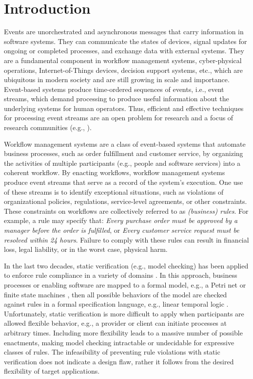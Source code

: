\chapter{Introduction}
\label{chapter:introduction}

Events are unorchestrated and asynchronous messages
that carry information in software systems.
They can communicate the states of devices,
signal updates for ongoing or completed processes,
and exchange data with external systems.
They are a fundamental component in
workflow management systems,
cyber-physical operations,
Internet-of-Things devices,
decision support systems,
etc.,
which are ubiquitous in modern society
and are still growing in scale and importance.
Event-based systems produce time-ordered sequences of events,
i.e., event streams,
which demand processing to produce useful information
about the underlying systems for human operators.
Thus,
efficient and effective techniques for processing event streams
are an open problem for research
and a focus of research communities
(e.g., \cite{zhou2022proceedings}).

Workflow management systems
are a class of event-based systems
that automate business processes,
such as order fulfillment and customer service,
by organizing the activities of multiple participants
(e.g., people and software services)
into a coherent workflow.
By enacting workflows,
workflow management systems produce event streams
that serve as a record of the system's execution.
One use of these streams is
to identify exceptional situations,
such as
violations of organizational policies,
regulations, service-level agreements,
or other constraints.
These constraints on workflows
are collectively referred to as {\em (business) rules}.
For example,
a rule may specify that:
{\em Every purchase order must be approved by a manager
before the order is fulfilled},
or
{\em Every customer service request must be resolved within 24 hours}.
Failure to comply with these rules
can result in financial loss,
legal liability,
or in the worst case,
physical harm.

In the last two decades,
static verification (e.g., model checking) has been applied to enforce rule compliance
in a variety of domains \cite{DamaggioDHV:BPM11:verif,CalvanesePODS13}.
In this approach, 
business processes or 
enabling software
are mapped to a formal model,
e.g., a Petri net \cite{du2014timed}
or finite state machines
\cite{BultanSF:IEEEIC,krotsiani2017cloud},
then
all possible behaviors of the model
are checked against rules in a formal specification language,
e.g., linear temporal logic \cite{pnueli1977temporal}.
Unfortunately,
static verification is more difficult to apply
when participants
are allowed flexible behavior,
e.g., a provider or client can initiate processes at arbitrary times.
Including more flexibility
leads to a massive number of possible enactments,
making model checking intractable or undecidable
for expressive classes of rules.
The infeasibility of
preventing rule violations with static verification 
does not indicate a design flaw,
rather it follows from the desired flexibility
of target applications.


